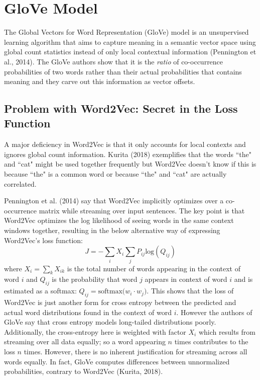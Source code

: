 \section{GloVe Model}

The Global Vectors for Word Representation (GloVe) model is an unsupervised learning algorithm that aims to capture meaning in a semantic vector space using global count statistics instead of only local contextual information (Pennington et al., 2014). The GloVe authors show that it is the \emph{ratio} of co-occurrence probabilities of two words rather than their actual probabilities that contains meaning and they carve out this information as vector offsets. 

\subsection{Problem with Word2Vec: Secret in the Loss Function}

A major deficiency in Word2Vec is that it only accounts for local contexts and ignores global count information. Kurita (2018) exemplifies that the words ``the" and ``cat" might be used together frequently but Word2Vec doesn't know if this is because ``the" is a common word or because ``the" and ``cat" are actually correlated. 

Pennington et al. (2014) say that Word2Vec implicitly optimizes over a co-occurrence matrix while streaming over input sentences. The key point is that Word2Vec optimizes the log likelihood of seeing words in the same context windows together, resulting in the below alternative way of expressing Word2Vec's loss function: 
$$
J = - \sum_i X_i \sum_j P_{ij} \text{log}(Q_{ij}) 
$$
where $X_i = \sum_k X_{ik}$ is the total number of words appearing in the context of word $i$ and $Q_{ij}$ is the probability that word $j$ appears in context of word $i$ and is estimated as a softmax: $Q_{ij} = \text{softmax} \Big( w_i \cdot w_j \Big)$. This shows that the loss of Word2Vec is just another form for cross entropy between the predicted and actual word distributions found in the context of word $i$. However the authors of GloVe say that cross entropy models long-tailed distributions poorly. Additionally, the cross-entropy here is weighted with factor $X_i$ which results from streaming over all data equally; so a word appearing $n$ times contributes to the loss $n$ times. 
However, there is no inherent justification for streaming across all words equally. In fact, GloVe computes differences between unnormalized probabilities, contrary to Word2Vec (Kurita, 2018). 


